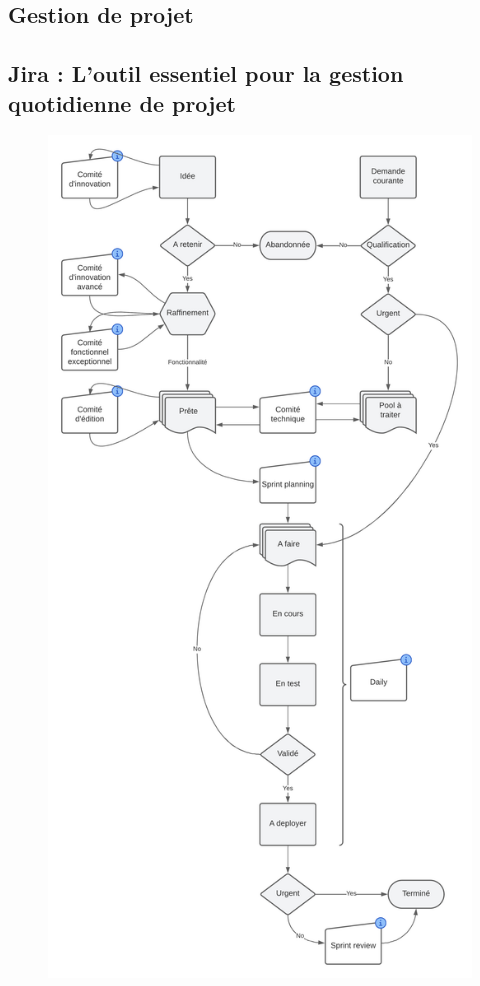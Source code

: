 \begin{appendices}

    \chapter{Gestion de projet}\label{ch-a:gestion-projet}

    \section[Jira : L'outil pour la gestion de projet]{Jira : L'outil essentiel pour la gestion quotidienne de projet}\label{sec-a:jira}

    \begin{figure}[ht]
        \centering
        \includegraphics[height=0.94\textheight]{img/lifecycle-of-incoming-ideas}

\end{figure}
\end{appendices}
